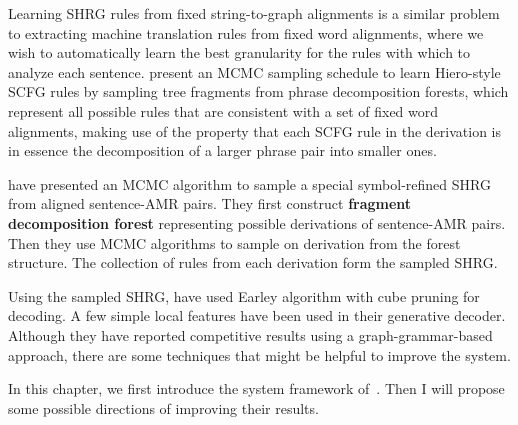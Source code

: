 Learning SHRG rules 
from fixed string-to-graph alignments is a similar problem to extracting machine translation rules from fixed word
alignments, where we wish to automatically learn the best granularity for the rules with which to analyze each
sentence.  present an MCMC sampling schedule to learn Hiero-style SCFG rules \cite{ChiangCL} by sampling 
tree fragments from phrase decomposition forests, which represent all possible
rules that are consistent with a set of fixed word alignments, making use of the property that each SCFG rule in the 
derivation is in essence the 
decomposition of a larger phrase pair into smaller ones.


 have presented an MCMC algorithm to sample a special symbol-refined SHRG from aligned sentence-AMR pairs. They first construct {\bf fragment decomposition forest} representing possible derivations
of sentence-AMR pairs. Then they use MCMC algorithms to sample on derivation from the forest structure. The collection of rules from each derivation form the sampled SHRG. 


Using the sampled SHRG,  have used Earley algorithm with cube pruning for decoding. A few simple local features have been used 
in their generative decoder. Although they have reported competitive results using a graph-grammar-based approach, there are some techniques that might be helpful to improve the system.


In this chapter, we first introduce the system framework of~.
Then I will propose some possible directions of improving their results. 
